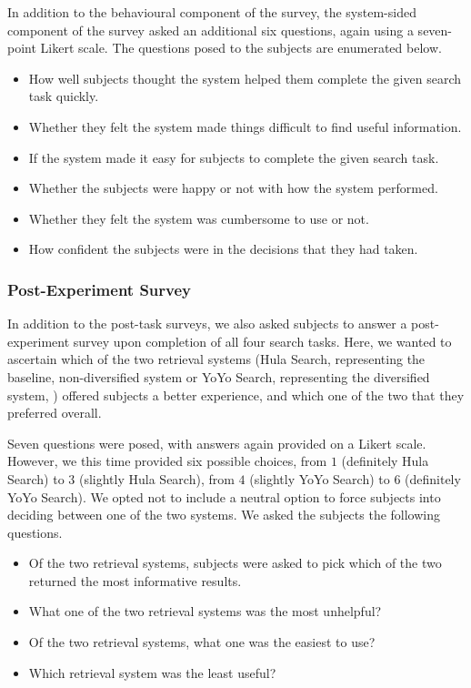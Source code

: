 In addition to the behavioural component of the survey, the system-sided component of the survey asked an additional six questions, again using a seven-point Likert scale. The questions posed to the subjects are enumerated below.

\begin{itemize}
    \item{ How well subjects thought the system helped them complete the given search task quickly.}
    \item{ Whether they felt the system made things difficult to find useful information.}
    \item{ If the system made it easy for subjects to complete the given search task.}
    \item{ Whether the subjects were happy or not with how the system performed.}
    \item{ Whether they felt the system was cumbersome to use or not.}
    \item{ How confident the subjects were in the decisions that they had taken.}
\end{itemize}

\subsubsection{Post-Experiment Survey}
In addition to the post-task surveys, we also asked subjects to answer a post-experiment survey upon completion of all four search tasks. Here, we wanted to ascertain which of the two retrieval systems (Hula Search, representing the baseline, non-diversified system  or YoYo Search, representing the diversified system, ) offered subjects a better experience, and which one of the two that they preferred overall.

Seven questions were posed, with answers again provided on a Likert scale. However, we this time provided six possible choices, from $1$ (definitely Hula Search) to $3$ (slightly Hula Search), from $4$ (slightly YoYo Search) to $6$ (definitely YoYo Search). We opted not to include a neutral option to force subjects into deciding between one of the two systems. We asked the subjects the following questions.

\begin{itemize}
    \item{ Of the two retrieval systems, subjects were asked to pick which of the two returned the most informative results.}
    \item{ What one of the two retrieval systems was the most unhelpful?}
    \item{ Of the two retrieval systems, what one was the easiest to use?}
    \item{ Which retrieval system was the least useful?}
\end{itemize}

